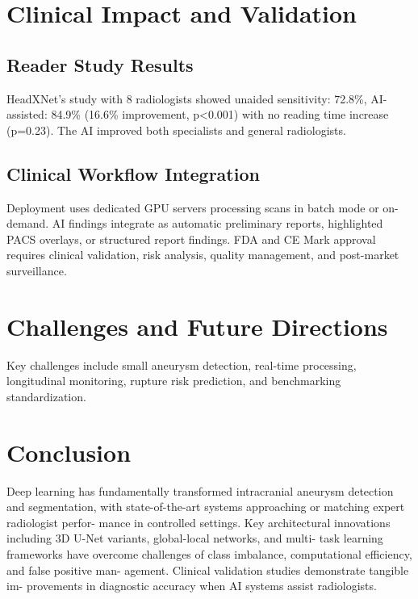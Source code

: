 \documentclass[conference]{IEEEtran}
\begin{document}
\section{Clinical Impact and Validation}

\subsection{Reader Study Results}

HeadXNet's study with 8 radiologists showed unaided sensitivity: 72.8\%, AI-assisted: 84.9\% (16.6\% improvement, p<0.001) with no reading time increase (p=0.23). The AI improved both specialists and general radiologists.

\subsection{Clinical Workflow Integration}



Deployment uses dedicated GPU servers processing scans in batch mode or on-demand. AI findings integrate as automatic preliminary reports, highlighted PACS overlays, or structured report findings. FDA and CE Mark approval requires clinical validation, risk analysis, quality management, and post-market surveillance.
\section{Challenges and Future Directions}

Key challenges include small aneurysm detection, real-time processing, longitudinal monitoring, rupture risk prediction, and benchmarking standardization.

\section{Conclusion}

Deep learning has fundamentally transformed intracranial
aneurysm detection and segmentation, with state-of-the-art
systems approaching or matching expert radiologist perfor-
mance in controlled settings. Key architectural innovations
including 3D U-Net variants, global-local networks, and multi-
task learning frameworks have overcome challenges of class
imbalance, computational efficiency, and false positive man-
agement. Clinical validation studies demonstrate tangible im-
provements in diagnostic accuracy when AI systems assist
radiologists.
\end{document}
